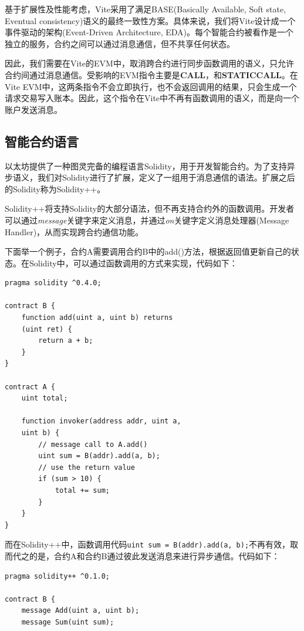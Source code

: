 \documentclass[UTF8,nofonts]{ctexart}
\begin{document}
\begin{multicols}{2}
基于扩展性及性能考虑，Vite采用了满足BASE(Basically Available, Soft state, Eventual consistency)\cite{Pritchett:2008:BAA:1394127.1394128}语义的最终一致性方案。具体来说，我们将Vite设计成一个事件驱动的架构(Event-Driven Architecture, EDA)\cite{eda}。每个智能合约被看作是一个独立的服务，合约之间可以通过消息通信，但不共享任何状态。

因此，我们需要在Vite的EVM中，取消跨合约进行同步函数调用的语义，只允许合约间通过消息通信。受影响的EVM指令主要是\textbf{CALL}，和\textbf{STATICCALL}。在Vite EVM中，这两条指令不会立即执行，也不会返回调用的结果，只会生成一个请求交易写入账本。因此，这个指令在Vite中不再有函数调用的语义，而是向一个账户发送消息。

\subsection{智能合约语言}
以太坊提供了一种图灵完备的编程语言Solidity，用于开发智能合约。为了支持异步语义，我们对Solidity进行了扩展，定义了一组用于消息通信的语法。扩展之后的Solidity称为Solidity++。

Solidity++将支持Solidity的大部分语法，但不再支持合约外的函数调用。开发者可以通过\emph{message}关键字来定义消息，并通过\emph{on}关键字定义消息处理器(Message Handler)，从而实现跨合约通信功能。

下面举一个例子，合约A需要调用合约B中的add()方法，根据返回值更新自己的状态。在Solidity中，可以通过函数调用的方式来实现，代码如下：

\begin{verbatim}
pragma solidity ^0.4.0;

contract B {
    function add(uint a, uint b) returns
    (uint ret) { 
        return a + b;
    }
}

contract A {
    uint total;    
   
    function invoker(address addr, uint a,
    uint b) {
        // message call to A.add()
        uint sum = B(addr).add(a, b);
        // use the return value
        if (sum > 10) {
            total += sum;
        }
    }
}
\end{verbatim}

而在Solidity++中，函数调用代码\texttt{uint sum = B(addr).add(a, b);}不再有效，取而代之的是，合约A和合约B通过彼此发送消息来进行异步通信。代码如下：

\begin{verbatim}
pragma solidity++ ^0.1.0;

contract B {
    message Add(uint a, uint b);
    message Sum(uint sum);
    

\end{verbatim}
\end{multicols}
\end{document}
